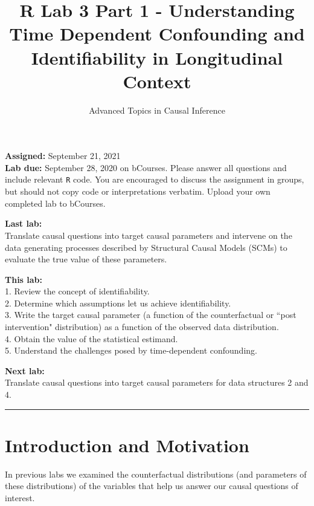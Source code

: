 \documentclass[answers]{exam}
\title{R Lab 3 Part 1 - Understanding Time Dependent Confounding and Identifiability in Longitudinal Context}
\author{Advanced Topics in Causal Inference}
\date{}
\begin{document}
\maketitle



\noindent \textbf{Assigned:} September 21, 2021\\
\textbf{Lab due:} September 28, 2020 on bCourses. Please answer all questions and include relevant \texttt{R} code. You are encouraged to discuss the assignment in groups, but should not copy code or interpretations verbatim. Upload your own completed lab to bCourses.



\noindent \textbf{Last lab:} \\
Translate causal questions into target causal parameters and intervene on the data generating processes described by Structural Causal Models (SCMs) to evaluate the true value of these parameters. 


\noindent \textbf{This lab:}\\
1. Review the concept of identifiability. \\
2. Determine which assumptions let us achieve identifiability. \\
3. Write the target causal parameter (a function of the counterfactual or ``post intervention" distribution) as a function of the observed data distribution. \\
4. Obtain the value of the statistical estimand. \\
5. Understand the challenges posed by time-dependent confounding.

\noindent \textbf{Next lab:}\\
Translate causal questions into target causal parameters for data structures 2 and 4. 


\begin{center}
\noindent\rule{18cm}{0.4pt}
\end{center}

\section{Introduction and Motivation}

In previous labs we examined the counterfactual distributions (and parameters of these distributions) of the variables that help us answer our causal questions of interest. 
\end{document}
